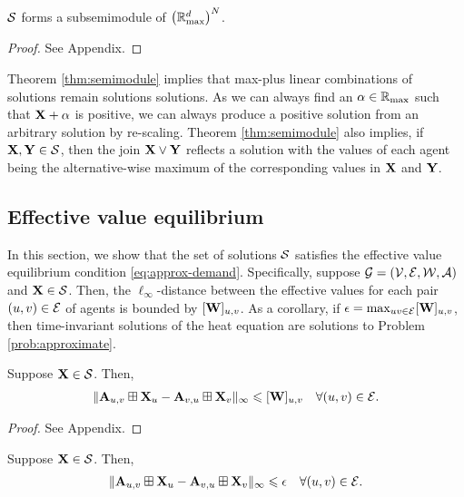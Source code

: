 \documentclass[letterpaper, 10 pt, conference]{ieeeconf}
\begin{document}
\begin{theorem} \label{thm:semimodule}
    $\mathcal{S}$ forms a subsemimodule of $\left(\mathbb{R}_{\mathrm{max}}^{d}\right)^N$.
\end{theorem}
\begin{proof}
    See Appendix.
\end{proof}

Theorem \ref{thm:semimodule} implies that max-plus linear combinations of solutions remain solutions solutions. As we can always find an $\alpha \in \mathbb{R}_{\mathrm{max}}$ such that $\mathbf{X} + \alpha$ is positive, we can always produce a positive solution from an arbitrary solution by re-scaling. Theorem \ref{thm:semimodule} also implies, if $\mathbf{X}, \mathbf{Y} \in \mathcal{S}$, then the join $\mathbf{X} \vee \mathbf{Y}$ reflects a solution with the values of each agent being the alternative-wise maximum of the corresponding values in $\mathbf{X}$ and $\mathbf{Y}$.

\subsection{Effective value equilibrium}
\label{sec:time-invariant}

In this section, we show that the set of solutions $\mathcal{S}$ satisfies the effective value equilibrium condition \eqref{eq:approx-demand}. Specifically, suppose $\mathcal{G} = (\mathcal{V}, \mathcal{E}, \mathcal{W}, \mathcal{A})$ and $\mathbf{X} \in \mathcal{S}$. Then, the $\ell_\infty$-distance between the effective values for each pair $(u,v) \in \mathcal{E}$ of agents is bounded by $[\mathbf{W}]_{u,v}$. As a corollary, if $\epsilon = \max_{uv \in \mathcal{E}} [\mathbf{W}]_{u,v}$, then time-invariant solutions of the heat equation are solutions to Problem \ref{prob:approximate}.

\begin{theorem} \label{thm:existence}
    Suppose $\mathbf{X} \in \mathcal{S}$. Then,
    \begin{align}
        \| \mathbf{A}_{u,v} \boxplus \mathbf{X}_u - \mathbf{A}_{v,u} \boxplus \mathbf{X}_v \|_{\infty} \leqslant [\mathbf{W}]_{u,v} \quad \forall (u,v) \in \mathcal{E}.
        \nonumber
    \end{align}
\end{theorem}
\begin{proof}
    See Appendix.
\end{proof}
\begin{corollary} Suppose $\mathbf{X} \in \mathcal{S}$. Then,
\begin{align*}
        \| \mathbf{A}_{u,v} \boxplus \mathbf{X}_u - \mathbf{A}_{v,u} \boxplus \mathbf{X}_v \|_{\infty} \leqslant \epsilon \quad \forall (u,v) \in \mathcal{E}.
    \end{align*}
\end{corollary}
\end{document}
